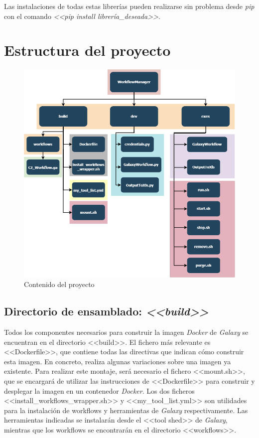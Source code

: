         Las instalaciones de todas estas librerías pueden realizarse sin problema desde \textit{pip} con el comando \textit{<<pip install librería\_deseada>>}.

\section{Estructura del proyecto}
\begin{figure}
    \begin{center}
      \includegraphics[scale=0.4]{images/FolderStructure.png}
      \caption{Contenido del proyecto}
      \label{fig:ContenidoDelProyecto}
    \end{center}
\end{figure}

\subsection{Directorio de ensamblado: \textit{<<build>>}}
Todos los componentes necesarios para construir la imagen \textit{Docker} de \textit{Galaxy} se encuentran en el directorio <<build>>. El fichero más relevante es <<Dockerfile>>, que contiene todas las directivas que indican cómo construir esta imagen. En concreto, realiza algunas variaciones sobre una imagen ya existente. Para realizar este montaje, será necesario el fichero <<mount.sh>>, que se encargará de utilizar las instrucciones de <<Dockerfile>> para construir y desplegar la imagen en un contenedor \textit{Docker}. Los dos ficheros <<install\_workflows\_wrapper.sh>> y <<my\_tool\_list.yml>> son utilidades para la instalación de workflows y herramientas de \textit{Galaxy} respectivamente. Las herramientas indicadas se instalarán desde el <<tool shed>> de \textit{Galaxy}, mientras que los workflows se encontrarán en el directorio <<workflows>>.

